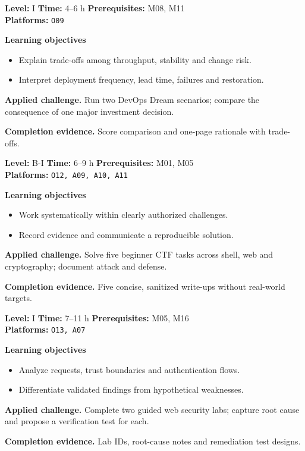 \documentclass[10pt,letterpaper,oneside]{article}
\begin{document}
\vspace{2.5pt}
\begin{skillbox}[title={M15 \quad DevOps strategy and flow metrics}]
\textbf{Level:} I \quad \textbf{Time:} 4--6 h \quad \textbf{Prerequisites:} M08, M11\\
\textbf{Platforms:} \texttt{O09}\par
\textbf{Learning objectives}
\begin{itemize}
\item Explain trade-offs among throughput, stability and change risk.
\item Interpret deployment frequency, lead time, failures and restoration.
\end{itemize}
\textbf{Applied challenge.} Run two DevOps Dream scenarios; compare the consequence of one major investment decision.\par
\textbf{Completion evidence.} Score comparison and one-page rationale with trade-offs.\par
\end{skillbox}
\vspace{2.5pt}
\begin{skillbox}[title={M16 \quad Capture-the-flag fundamentals}]
\textbf{Level:} B-I \quad \textbf{Time:} 6--9 h \quad \textbf{Prerequisites:} M01, M05\\
\textbf{Platforms:} \texttt{O12, A09, A10, A11}\par
\textbf{Learning objectives}
\begin{itemize}
\item Work systematically within clearly authorized challenges.
\item Record evidence and communicate a reproducible solution.
\end{itemize}
\textbf{Applied challenge.} Solve five beginner CTF tasks across shell, web and cryptography; document attack and defense.\par
\textbf{Completion evidence.} Five concise, sanitized write-ups without real-world targets.\par
\end{skillbox}
\vspace{2.5pt}
\begin{skillbox}[title={M17 \quad Guided web and network security labs}]
\textbf{Level:} I \quad \textbf{Time:} 7--11 h \quad \textbf{Prerequisites:} M05, M16\\
\textbf{Platforms:} \texttt{O13, A07}\par
\textbf{Learning objectives}
\begin{itemize}
\item Analyze requests, trust boundaries and authentication flows.
\item Differentiate validated findings from hypothetical weaknesses.
\end{itemize}
\textbf{Applied challenge.} Complete two guided web security labs; capture root cause and propose a verification test for each.\par
\textbf{Completion evidence.} Lab IDs, root-cause notes and remediation test designs.\par
\end{skillbox}
\end{document}

